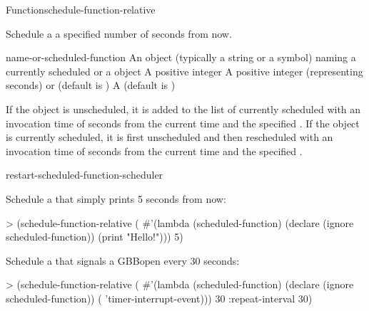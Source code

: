 \begin{functiondoc}{Function}{schedule-function-relative}%
  { 
     }
%
%
%

\fnsyntax

\fnpurpose Schedule a  a specified number of
seconds from now.

\fnpackage {}

\fnmodule {}

\fnargs
\begin{args}{name-or-scheduled-function}
 An object (typically a string or a
  symbol) naming a currently scheduled  or a
   object
\arg[seconds] A positive integer
 A positive integer (representing seconds) or
  \nil{} (default is \nil)
\arg[verbose] A 
  (default is \textbf{})
\end{args}

\fnerrors
\nothreads{}

\fndescription If the  object is unscheduled, it is
added to the list of currently scheduled  with an
invocation time of  seconds from the current time and the
specified .  If the  object is
currently scheduled, it is first unscheduled and then rescheduled with an
invocation time of  seconds from the current time and the
specified .

\begin{alsos}{restart-scheduled-function-scheduler}
\end{alsos}

%
\fnexamples
%
Schedule a  that simply prints  
5 seconds from now:
%
\W\supp
\begin{example}
> (schedule-function-relative
    (
      #'(lambda (scheduled-function)
          (declare (ignore scheduled-function))
          (print "Hello!")))
     5)
\end{example}
%
%
%
%
Schedule a  that signals a GBBopen
 every 30 seconds:
%
\W\supp\notpretop
\begin{example}
> (schedule-function-relative
    (
      #'(lambda (scheduled-function)
          (declare (ignore scheduled-function))
          ( 'timer-interrupt-event)))
    30
    :repeat-interval 30)
\end{example}


\end{functiondoc}
